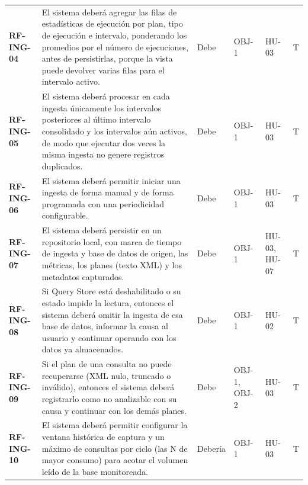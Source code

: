 \documentclass[11pt,a4paper]{report}
\begin{document}
\begin{footnotesize}
\begin{xltabular}{\linewidth}{@{}p{1.7cm}Xp{1.1cm}p{1.3cm}p{1.6cm}p{0.9cm}@{}}
\textbf{RF-ING-04} & El sistema deberá agregar las filas de estadísticas de ejecución por plan, tipo de ejecución e intervalo, ponderando los promedios por el número de ejecuciones, antes de persistirlas, porque la vista puede devolver varias filas para el intervalo activo. & Debe & OBJ-1 & HU-03 & T \\
\textbf{RF-ING-05} & El sistema deberá procesar en cada ingesta únicamente los intervalos posteriores al último intervalo consolidado y los intervalos aún activos, de modo que ejecutar dos veces la misma ingesta no genere registros duplicados. & Debe & OBJ-1 & HU-03 & T \\
\textbf{RF-ING-06} & El sistema deberá permitir iniciar una ingesta de forma manual y de forma programada con una periodicidad configurable. & Debe & OBJ-1 & HU-03 & T \\
\textbf{RF-ING-07} & El sistema deberá persistir en un repositorio local, con marca de tiempo de ingesta y base de datos de origen, las métricas, los planes (texto XML) y los metadatos capturados. & Debe & OBJ-1 & HU-03, HU-07 & T \\
\textbf{RF-ING-08} & Si Query Store está deshabilitado o su estado impide la lectura, entonces el sistema deberá omitir la ingesta de esa base de datos, informar la causa al usuario y continuar operando con los datos ya almacenados. & Debe & OBJ-1 & HU-02 & T \\
\textbf{RF-ING-09} & Si el plan de una consulta no puede recuperarse (XML nulo, truncado o inválido), entonces el sistema deberá registrarlo como no analizable con su causa y continuar con los demás planes. & Debe & OBJ-1, OBJ-2 & HU-03 & T \\
\textbf{RF-ING-10} & El sistema deberá permitir configurar la ventana histórica de captura y un máximo de consultas por ciclo (las N de mayor consumo) para acotar el volumen leído de la base monitoreada. & Debería & OBJ-1 & HU-03 & T \\

\end{xltabular}
\end{footnotesize}
\end{document}

